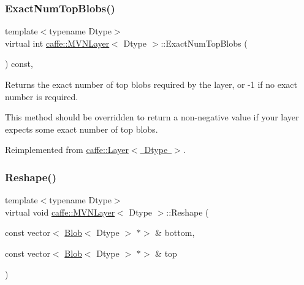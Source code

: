 \subsubsection{\texorpdfstring{Exact\+Num\+Top\+Blobs()}{ExactNumTopBlobs()}\hspace{0.1cm}{\footnotesize\ttfamily [2/2]}}
{\footnotesize\ttfamily template$<$typename Dtype$>$ \\
virtual int \mbox{\hyperlink{classcaffe_1_1_m_v_n_layer}{caffe\+::\+M\+V\+N\+Layer}}$<$ Dtype $>$\+::Exact\+Num\+Top\+Blobs (\begin{DoxyParamCaption}{ }\end{DoxyParamCaption}) const\hspace{0.3cm}{\ttfamily [inline]}, {\ttfamily [virtual]}}



Returns the exact number of top blobs required by the layer, or -\/1 if no exact number is required. 

This method should be overridden to return a non-\/negative value if your layer expects some exact number of top blobs. 

Reimplemented from \mbox{\hyperlink{classcaffe_1_1_layer_a64e2ca72c719e4b2f1f9216ccfb0d37f}{caffe\+::\+Layer$<$ Dtype $>$}}.

\mbox{\label{classcaffe_1_1_m_v_n_layer_afcb6c5f28b45496eed1b0ea19705b763}} 
\subsubsection{\texorpdfstring{Reshape()}{Reshape()}\hspace{0.1cm}{\footnotesize\ttfamily [1/2]}}
{\footnotesize\ttfamily template$<$typename Dtype$>$ \\
virtual void \mbox{\hyperlink{classcaffe_1_1_m_v_n_layer}{caffe\+::\+M\+V\+N\+Layer}}$<$ Dtype $>$\+::Reshape (\begin{DoxyParamCaption}\item[{const vector$<$ \mbox{\hyperlink{classcaffe_1_1_blob}{Blob}}$<$ Dtype $>$ $\ast$$>$ \&}]{bottom,  }\item[{const vector$<$ \mbox{\hyperlink{classcaffe_1_1_blob}{Blob}}$<$ Dtype $>$ $\ast$$>$ \&}]{top }\end{DoxyParamCaption})\hspace{0.3cm}{\ttfamily [virtual]}}



